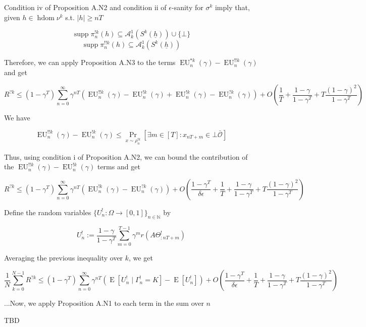 \documentclass[a4paper]{article}
\DeclareMathOperator{\Supp}{supp}
\newcommand{\E}[1]{\underset{#1}{\operatorname{E}}}
\newcommand{\Nats}{\mathbb{N}}
\newcommand{\Sq}[2]{\{#1\}_{#2 \in \Nats}}
\newcommand{\Sqn}[1]{\Sq{#1}{n}}
\newcommand{\Abs}[1]{\lvert #1 \rvert}
\newcommand{\Ob}{\mathcal{O}}
\newcommand{\A}{\mathcal{A}}
\newcommand{\Ado}{\bar{\Ob}}
\DeclareMathOperator{\HD}{hdom}
\newcommand{\EU}{\operatorname{EU}}
\begin{document}
Condition iv of Proposition A.N2 and condition ii of $\epsilon$-sanity for $\sigma^k$ imply that, given $h \in \HD{\nu^k}$ s.t. $\Abs{h} \geq nT$

$$\Supp{\pi^{!k}_n(h)} \subseteq \A^1_k\left(S^k\left(\underline{h}\right)\right) \cup \{\bot\}$$
%
$$\Supp{\pi^{!!k}_n(h)} \subseteq \A^1_k\left(S^k\left(\underline{h}\right)\right)$$

Therefore, we can apply Proposition A.N3 to the terms $\EU^{*k}_n(\gamma)-\EU^{!!k}_n(\gamma)$ and get

$$R^{?k} \leq (1-\gamma^T)\sum_{n=0}^\infty \gamma^{nT} \left(\EU^{!!k}_n(\gamma)-\EU^{!k}_n(\gamma)+\EU^{!k}_n(\gamma)-\EU^{?k}_n(\gamma)\right) + O\left(\frac{1}{T}+\frac{1-\gamma}{1-\gamma^T}+T\frac{(1-\gamma)^2}{1-\gamma^T}\right)$$

We have

$$\EU^{!!k}_n(\gamma)-\EU^{!k}_n(\gamma) \leq \Pr_{x\sim\rho^{!k}_n}\left[\exists m \in [T]: x_{nT+m} \in \bot\Ado\right]$$

Thus, using condition i of Proposition A.N2, we can bound the contribution of the $\EU^{!!k}_n(\gamma)-\EU^{!k}_n(\gamma)$ terms and get

$$R^{?k} \leq (1-\gamma^T)\sum_{n=0}^\infty \gamma^{nT} \left(\EU^{!k}_n(\gamma)-\EU^{?k}_n(\gamma)\right) + O\left(\frac{1-\gamma^T}{\delta\epsilon}+\frac{1}{T}+\frac{1-\gamma}{1-\gamma^T}+T\frac{(1-\gamma)^2}{1-\gamma^T}\right)$$

Define the random variables $\Sqn{U^!_n : \Omega \rightarrow [0,1]}$ by 

$$U^!_n:=\frac{1-\gamma}{1-\gamma^T}\sum_{m=0}^{T-1} \gamma^{m} r\left(A\Theta^!_{:nT+m}\right)$$

Averaging the previous inequality over $k$, we get

$$\frac{1}{N}\sum_{k=0}^{N-1}R^{?k} \leq (1-\gamma^T)\sum_{n=0}^\infty \gamma^{nT} \left(\E{}\left[U^!_n \mid \Gamma^!_n = K\right]-\E{}\left[U^!_n\right]\right) + O\left(\frac{1-\gamma^T}{\delta\epsilon}+\frac{1}{T}+\frac{1-\gamma}{1-\gamma^T}+T\frac{(1-\gamma)^2}{1-\gamma^T}\right)$$


...Now, we apply Proposition A.N1 to each term in the sum over $n$

TBD
\end{document}
